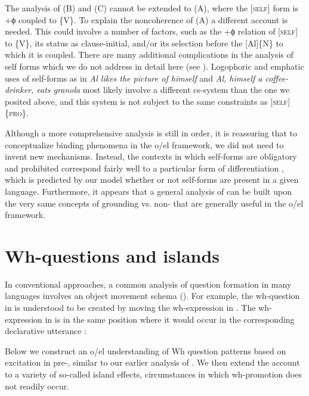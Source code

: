   The analysis of (B) and (C) cannot be extended to (A), where the [\textsc{self}] form is +ϕ coupled to \{V\}. To explain the noncoherence of (A) a different account is needed. This could involve a number of factors, such as the +ϕ relation of [\textsc{self}] to \{V\}, its status as clause-initial, and/or its selection before the  [Al]\{N\} to which it is coupled. There are many additional complications in the analysis of self forms which we do not address in detail here (see \citealt{KönigSiemund2000,Safir2004}). Logophoric and emphatic uses of self-forms as in \textit{Al likes the picture of himself} and \textit{Al, himself a coffee-drinker, eats granola} most likely involve a different cs-system than the one we posited above, and this system is not subject to the same constraints as [\textsc{self}]\{\textsc{pro}\}. 

  Although a more comprehensive analysis is still in order, it is reassuring that to conceptualize binding phenomena in the o/el framework, we did not need to invent new mechanisms. Instead, the contexts in which self-forms are obligatory and prohibited correspond fairly well to a particular form of differentiation , which is predicted by our model whether or not self-forms are present in a given language. Furthermore, it appears that a general analysis of  can be built upon the very same concepts of grounding vs. non- that are generally useful in the o/el framework.

\section{Wh-questions and islands}

In conventional approaches, a common analysis of question formation in many languages involves an object movement schema (\citealt{Baker1970,Cheng1997,Chomsky1965,Karttunen1977}). For example, the wh-question in  is understood to be created by moving the wh-expression in . The wh-expression in  is in the same position where it would occur in the corresponding declarative utterance :

\ea\label{ex:7:17}
\label{ex:7:17a}
\label{ex:7:17b}
\label{ex:7:17c}
\z
\z

  Below we construct an o/el understanding of Wh question patterns based on excitation in pre-, similar to our earlier analysis of . We then extend the account to a variety of so-called island effects, circumstances in which wh-promotion does not readily occur. 

